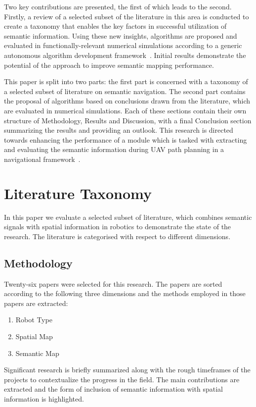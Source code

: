 \documentclass[twocolumn,letterpaper]{IEEEAerospaceCLS}  %
\begin{document}
Two key contributions are presented, the first of which leads to the second. Firstly, a review of a selected subset of the literature in this area is conducted to create a taxonomy that enables the key factors in successful utilization of semantic information. Using these new insights, algorithms are proposed and evaluated in functionally-relevant numerical simulations according to a generic autonomous algorithm development framework~\cite{ladosz_generic_2019}. Initial results demonstrate the potential of the approach to improve semantic mapping performance.

This paper is split into two parts: the first part is concerned with a taxonomy of a selected subset of literature on semantic navigation. The second part contains the proposal of algorithms based on conclusions drawn from the literature, which are evaluated in numerical simulations. Each of these sections contain their own structure of Methodology, Results and Discussion, with a final Conclusion section summarizing the results and providing an outlook.  This research is directed towards enhancing the performance of a module which is tasked with extracting and evaluating the semantic information during UAV path planning in a navigational framework~\cite{mandel_towards_2020}.

\section{Literature Taxonomy} \label{sec:Lit}
In this paper we evaluate a selected subset of literature, which combines semantic signals with spatial information in robotics to demonstrate the state of the research. The literature is categorised with respect to different dimensions.
\subsection{Methodology} \label{ssec:LitMet}
Twenty-six papers were selected for this research. The papers are sorted according to the following three dimensions and the methods employed in those papers are extracted:
\begin{enumerate}
    \item Robot Type
    \item Spatial Map
    \item Semantic Map
\end{enumerate}
Significant research is briefly summarized along with the rough timeframes of the projects to contextualize the progress in the field. The main contributions are extracted and the form of inclusion of semantic information with spatial information is highlighted.
\end{document}
